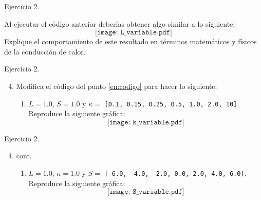 \documentclass{beamer}
\begin{document}
\begin{frame}[fragile]
	
{\small 
\begin{exampleblock}{Ejercicio 2.}

Al ejecutar el código anterior deberías obtener algo similar a lo siguiente:
$$\texttt{[image: L\_variable.pdf]} $$
Explique el comportamiento de este resultado en términos matemáticos y físicos de la conducción de calor.
\end{exampleblock}
}
\end{frame}

\begin{frame}[fragile]
	
{\small 
\begin{exampleblock}{Ejercicio 2.}
\begin{enumerate}
\setcounter{enumi}{3}
\item Modifica el código del punto \ref{en:codigo} para hacer lo siguiente:
\begin{enumerate}[a]
	\item {\footnotesize $L = 1.0$, $S = 1.0$ y $\kappa = $ \texttt{[0.1, 0.15, 0.25, 0.5, 1.0, 2.0, 10]}.}
	Reproduce la siguiente gráfica:
	$$\texttt{[image: k\_variable.pdf]} $$	
\end{enumerate}
\end{enumerate}

\end{exampleblock}
}
\end{frame}

\begin{frame}[fragile]
	
{\small 
\begin{exampleblock}{Ejercicio 2.}
\begin{enumerate}
\setcounter{enumi}{3}
\item cont.
\begin{enumerate}[b]
	\item {\footnotesize $L = 1.0$, $\kappa = 1.0$ y $S = $ \texttt{[-6.0, -4.0, -2.0, 0.0, 2.0, 4.0, 6.0]}.}
	Reproduce la siguiente gráfica:
	$$\texttt{[image: S\_variable.pdf]} $$
\end{enumerate}
\end{enumerate}

\end{exampleblock}
}
\end{frame}
\end{document}
